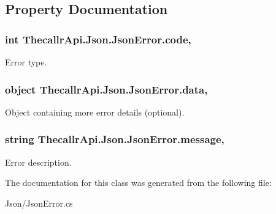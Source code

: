 \subsection{Property Documentation}
\hypertarget{class_thecallr_api_1_1_json_1_1_json_error_afedfded0b702f999b5dbf2765cb296e3}{
\subsubsection[{code}]{\setlength{\rightskip}{0pt plus 5cm}int Thecallr\+Api.\+Json.\+Json\+Error.\+code\hspace{0.3cm}{\ttfamily [get]}, {\ttfamily [set]}}}\label{class_thecallr_api_1_1_json_1_1_json_error_afedfded0b702f999b5dbf2765cb296e3}


Error type. 

\hypertarget{class_thecallr_api_1_1_json_1_1_json_error_a0817a85286acbf457ae240f0a17a6140}{
\subsubsection[{data}]{\setlength{\rightskip}{0pt plus 5cm}object Thecallr\+Api.\+Json.\+Json\+Error.\+data\hspace{0.3cm}{\ttfamily [get]}, {\ttfamily [set]}}}\label{class_thecallr_api_1_1_json_1_1_json_error_a0817a85286acbf457ae240f0a17a6140}


Object containing more error details (optional). 

\hypertarget{class_thecallr_api_1_1_json_1_1_json_error_adb98db03a6d6c2a5f6d209cfbd38d96f}{
\subsubsection[{message}]{\setlength{\rightskip}{0pt plus 5cm}string Thecallr\+Api.\+Json.\+Json\+Error.\+message\hspace{0.3cm}{\ttfamily [get]}, {\ttfamily [set]}}}\label{class_thecallr_api_1_1_json_1_1_json_error_adb98db03a6d6c2a5f6d209cfbd38d96f}


Error description. 



The documentation for this class was generated from the following file\+:\begin{DoxyCompactItemize}
\item 
Json/Json\+Error.\+cs\end{DoxyCompactItemize}

